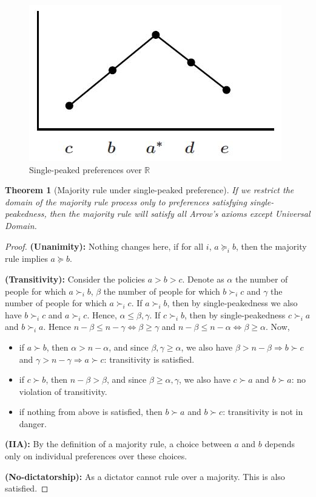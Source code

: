 \documentclass[12pt]{report}
\newtheorem{theorem}{Theorem}[chapter]
\begin{document}
\begin{figure}[ht!]
\centering
\includegraphics[scale=0.6]{images/sppref}
\caption{Single-peaked preferences over $\mathbb{R}$}
\end{figure}

\begin{theorem}[Majority rule under single-peaked preference]
If we restrict the domain of the majority rule process only to preferences satisfying single-peakedness, then the majority rule will satisfy all Arrow's axioms except Universal Domain.
\end{theorem}

\begin{proof}
\textbf{(Unanimity):} Nothing changes here, if for all $i$, $a\succeq_i b$, then the majority rule implies $a\succeq b$.

\textbf{(Transitivity):} Consider the policies $a>b>c$. Denote as $\alpha$ the number of people for which $a \succ_i b$, $\beta$ the number of people for which $b \succ_i c$ and $\gamma$ the number of people for which $a \succ_i c$. If $a\succ_i b$, then by single-peakedness we also have $b \succ_i c$ and $a\succ_i c$. Hence, $\alpha \leq \beta, \gamma$. If $c\succ_i b$, then by single-peakedness $c \succ_i a$ and $b \succ_i a$. Hence $n - \beta \leq n - \gamma \Leftrightarrow \beta \geq \gamma$ and $n - \beta \leq n - \alpha \Leftrightarrow \beta \geq \alpha$. Now,\begin{itemize}
\item if $a \succ b$, then $\alpha > n - \alpha$, and since $\beta, \gamma \geq \alpha$, we also have $\beta > n - \beta \Rightarrow b \succ c$ and $\gamma > n - \gamma \Rightarrow a \succ c$: transitivity is satisfied.
\item if $c\succ b$, then $n - \beta > \beta$, and since $\beta \geq \alpha, \gamma$, we also have $c\succ a$ and $b \succ a$: no violation of transitivity.
\item if nothing from above is satisfied, then $b\succ a$ and $b\succ c$: transitivity is not in danger.
\end{itemize}

\textbf{(IIA):} By the definition of a majority rule, a choice between $a$ and $b$ depends only on individual preferences over these choices.

\textbf{(No-dictatorship):} As a dictator cannot rule over a majority. This is also satisfied.
\end{proof}
\end{document}
